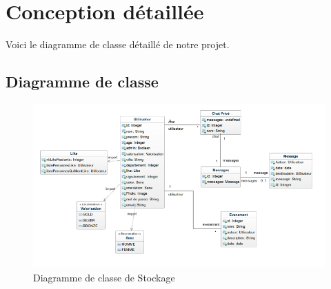 \chapter{Conception détaillée}
Voici le diagramme de classe détaillé de notre projet.
\section{Diagramme de classe}
\vfill
\begin{figure}[ht!]
  \centering
   \caption{Diagramme de classe de Stockage}
   \includegraphics[scale=0.6]{ddc}
\end{figure}
\newpage
